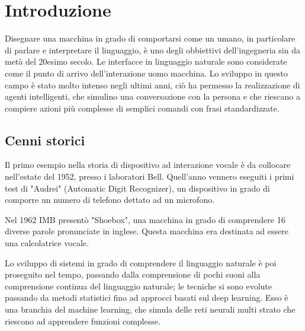 \documentclass[twoside]{supsistudent}
\begin{document}
\maketitle
\onehalfspacing
\frontmatter



\newpage
\mainmatter
{}
\setcounter{page}{1}

\chapter{Introduzione}

Disegnare una macchina in grado di comportarsi come un umano, in particolare di parlare e interpretare il linguaggio, è uno degli obbiettivi dell'ingegneria sin da metà del 20esimo secolo. Le interfacce in linguaggio naturale sono considerate come il punto di arrivo dell'interazione uomo macchina.
Lo sviluppo in questo campo è stato molto intenso negli ultimi anni, ciò ha permesso la realizzazione di agenti intelligenti, che simulino una conversazione con la persona e che riescano a compiere azioni più complesse di semplici comandi con frasi standardizzate.

\section{Cenni storici}

Il primo esempio nella storia di dispositivo ad interazione vocale è da collocare nell'estate del 1952, presso i laboratori Bell.
Quell'anno vennero eseguiti i primi test di "Audrei" (Automatic Digit Recognizer), un dispositivo in grado di comporre un numero di telefono dettato ad un microfono.

Nel 1962 IMB presentò "Shoebox", una macchina in grado di comprendere 16 diverse parole pronunciate in inglese. Questa macchina era destinata ad essere una calcolatrice vocale.

Lo sviluppo di sistemi in grado di comprendere il linguaggio naturale è poi proseguito nel tempo, passando dalla comprensione di pochi suoni alla comprensione continua del linguaggio naturale; le tecniche si sono evolute passando da metodi statistici fino ad approcci basati sul deep learning. Esso è una branchia del machine learning, che simula delle reti neurali multi strato che riescono ad apprendere funzioni complesse. \cite{deeplearninggeneral}
\end{document}
